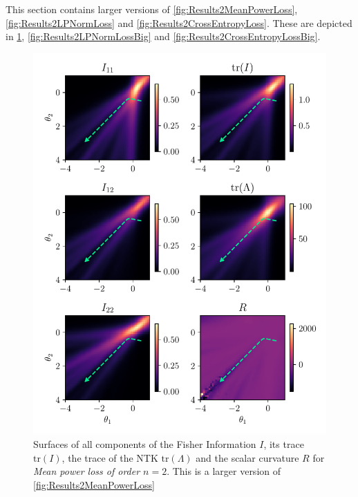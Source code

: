This section contains larger versions of \cref{fig:Results2MeanPowerLoss}, \cref{fig:Results2LPNormLoss} and \cref{fig:Results2CrossEntropyLoss}. These are depicted in \cref{fig:Results2MeanPowerLossBig}, \cref{fig:Results2LPNormLossBig} and \cref{fig:Results2CrossEntropyLossBig}.
\begin{figure}
	\centering
	\includegraphics{Experiment2/plots/MeanPowerLoss2_tracecomparison_Big.pdf}
	\caption{Surfaces of all components of the Fisher Information $I$, its trace $\mathrm{tr}(I)$, the trace of the NTK $\mathrm{tr}(\Lambda)$ and the scalar curvature $R$ for \emph{Mean power loss of order $n=2$}. This is a larger version of \cref{fig:Results2MeanPowerLoss}}
	\label{fig:Results2MeanPowerLossBig}
\end{figure}

